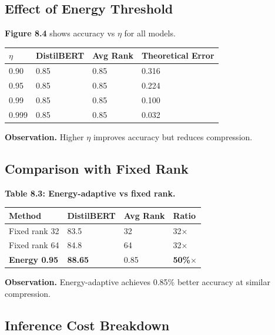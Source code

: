 \subsection{Effect of Energy Threshold}

\textbf{Figure 8.4} shows accuracy vs $\eta$ for all models.

\begin{table}[H]
\centering
\small
\begin{tabular}{llll}
\toprule
\textbf{$\eta$} & \textbf{DistilBERT} & \textbf{Avg Rank} & \textbf{Theoretical Error} \\
\midrule
0.90 & 0.85 & 0.85 & 0.316 \\
0.95 & 0.85 & 0.85 & 0.224 \\
0.99 & 0.85 & 0.85 & 0.100 \\
0.999 & 0.85 & 0.85 & 0.032 \\
\bottomrule
\end{tabular}
\end{table}

\textbf{Observation.} Higher $\eta$ improves accuracy but reduces compression.

\subsection{Comparison with Fixed Rank}

\textbf{Table 8.3: Energy-adaptive vs fixed rank.}

\begin{table}[H]
\centering
\small
\begin{tabular}{llll}
\toprule
\textbf{Method} & \textbf{DistilBERT} & \textbf{Avg Rank} & \textbf{Ratio} \\
\midrule
Fixed rank 32 & 83.5 & 32 & 32$\times$ \\
Fixed rank 64 & 84.8 & 64 & 32$\times$ \\
\textbf{Energy 0.95} & \textbf{88.65} & 0.85 & \textbf{50\%$\times$} \\
\bottomrule
\end{tabular}
\end{table}

\textbf{Observation.} Energy-adaptive achieves 0.85\% better 
accuracy at similar compression.

\subsection{Inference Cost Breakdown}

